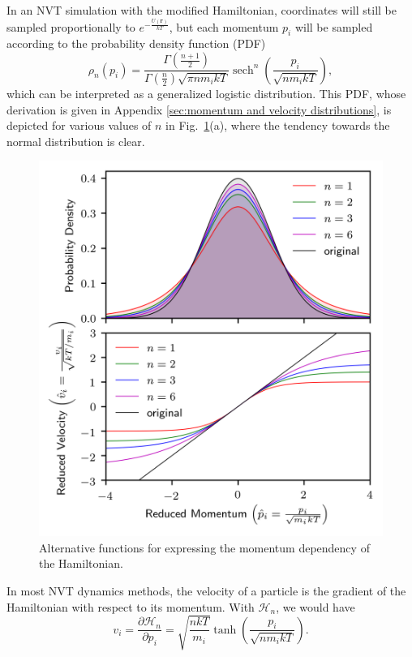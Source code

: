 \documentclass[
aip,
jcp,
reprint,
]{revtex4-1}
\DeclareMathOperator\sech{sech}
\newcommand{\vt}[1]{\boldsymbol{\mathbf{#1}}}          %
\newcommand{\diff}[2]{\frac{\partial #2}{\partial #1}} %
\newcommand{\nn}{n}
\begin{document}
In an NVT simulation with the modified Hamiltonian, coordinates will still be sampled proportionally to $e^{-\frac{U(\vt r)}{kT}}$, but each momentum $p_i$ will be sampled according to the probability density function (PDF)
\begin{equation}
\label{eq:momentum distribution}
\rho_n(p_i) = \frac{\Gamma\left(\frac{\nn+1}{2}\right)}{\Gamma\left(\frac{\nn}{2}\right) \sqrt{\pi \nn m_i k T}} \sech^\nn\left(\frac{p_i}{\sqrt{\nn m_i k T}}\right),
\end{equation}
which can be interpreted as a generalized logistic distribution.
This PDF, whose derivation is given in Appendix \ref{sec:momentum and velocity distributions}, is depicted for various values of $\nn$ in Fig.~\ref{fig:momentum distributions and velocity definition}(a), where the tendency towards the normal distribution is clear.

\begin{figure}
	\centering
	\includegraphics{momentum_functions}
	\caption{Alternative functions for expressing the momentum dependency of the Hamiltonian.}
	\label{fig:momentum distributions and velocity definition}
\end{figure}

In most NVT dynamics methods,
the velocity of a particle is the gradient of the Hamiltonian with respect to its momentum.
With $\mathcal{H}_n$, we would have
\begin{equation}
\label{eq:velocity definition}
v_i = \diff{p_i}{{\mathcal H}_n} = \sqrt{\frac{\nn k T}{m_i}} \tanh\left(\frac{p_i}{\sqrt{\nn m_i k T}}\right).
\end{equation}
\end{document}

